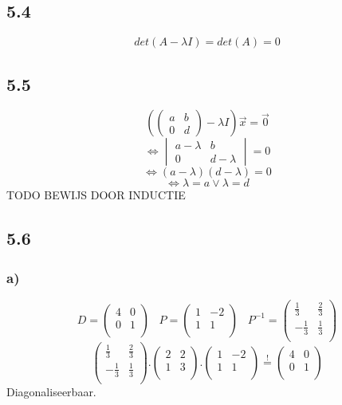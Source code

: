 \documentclass[11pt]{article}
\begin{document}
\subsection*{5.4}
\[
det(A-\lambda I)=det(A) = 0
\]

\subsection*{5.5}
\[\left(
\begin{pmatrix}
a & b \\
0 & d
\end{pmatrix}
-\lambda I \right)\vec{x} = \vec{0}
\]
\[
\Leftrightarrow
\begin{vmatrix}
a-\lambda & b \\
0 & d-\lambda
\end{vmatrix}
=0
\]
\[
\Leftrightarrow
(a-\lambda)(d-\lambda) = 0
\]
\[
\Leftrightarrow
\lambda=a \vee \lambda=d
\]
TODO BEWIJS DOOR INDUCTIE

\subsection*{5.6}
\subsubsection*{a)}
\[
D=
\begin{pmatrix}
4 & 0\\
0 & 1\\
\end{pmatrix}
\;\;\;
P=
\begin{pmatrix}
1 & -2\\
1 & 1\\
\end{pmatrix}
\;\;\;
P^{-1}=
\begin{pmatrix}
\frac{1}{3} & \frac{2}{3}\\
-\frac{1}{3} & \frac{1}{3}\\
\end{pmatrix}
\]
\[
\begin{pmatrix}
\frac{1}{3} & \frac{2}{3}\\
-\frac{1}{3} & \frac{1}{3}\\
\end{pmatrix}
.
\begin{pmatrix}
2 & 2\\
1 & 3\\
\end{pmatrix}
.
\begin{pmatrix}
1 & -2\\
1 & 1\\
\end{pmatrix}
 \overset{!}{=} 
\begin{pmatrix}
4 & 0\\
0 & 1\\
\end{pmatrix}
\]
Diagonaliseerbaar.
\end{document}
